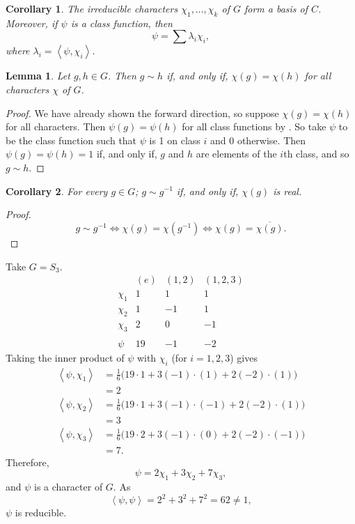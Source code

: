 \documentclass[11pt, notitlepage]{article}
\numberwithin{equation}{section}
\theoremstyle{plain}
\newtheorem{corollary}{Corollary}[theorem]
\newtheorem{lemma}[theorem]{Lemma}
\theoremstyle{definition}
\newenvironment{example}
	{\pushQED{\qed}\renewcommand{\qedsymbol}{$\blacktriangleleft$}\examplex}
	{\popQED\endexamplex}
\newcommand{\inner}[2]{\left\langle #1,#2 \right\rangle}
\begin{document}
\begin{corollary}
The irreducible characters $\chi_1,\dots,\chi_k$ of $G$ form a basis of $C$. Moreover, if $\psi$ is a class function, then
\[
    \psi = \sum \lambda_i \chi_i,
\]
where $\lambda_i = \inner{\psi}{\chi_i}$.
\end{corollary}

\begin{lemma}
Let $g, h \in G$. Then $g \sim h$ if, and only if, $\chi(g) = \chi(h)$ for all characters $\chi$ of $G$.
\end{lemma}

\begin{proof}
We have already shown the forward direction, so suppose $\chi(g) = \chi(h)$ for all characters. Then $\psi(g) = \psi(h)$ for all class functions by . So take $\psi$ to be the class function such that $\psi$ is 1 on class $i$ and 0 otherwise. Then $\psi(g) = \psi(h) = 1$ if, and only if, $g$ and $h$ are elements of the $i$th class, and so $g \sim h$.
\end{proof}

\begin{corollary}
For every $g \in G$; $g \sim g^{-1}$ if, and only if, $\chi(g)$ is real.
\end{corollary}

\begin{proof}
\[
    g \sim g^{-1} \iff \chi(g) = \chi(g^{-1}) \iff \chi(g) = \overline{\chi(g)}.
\]
\end{proof}

\begin{example}
Take $G = S_3$.
\[
    \begin{array}{c|rrr}
               & (e) & (1,2) & (1,2,3) \\\hline
        \chi_1 &  1  &   1   &    1    \\
        \chi_2 &  1  &  -1   &    1    \\
        \chi_3 &  2  &   0   &   -1    \\
               &     &       &         \\
        \psi   &  19 &  -1   &   -2
    \end{array}
\]
Taking the inner product of $\psi$ with $\chi_i$ (for $i=1,2,3$) gives
\begin{align*}
    \inner{\psi}{\chi_1} &= \frac{1}{6}\big(19 \cdot 1 + 3(-1)\cdot (1) + 2(-2) \cdot (1)\big)\\
    &= 2\\
    \inner{\psi}{\chi_2} &= \frac{1}{6}\big(19 \cdot 1 + 3(-1)\cdot (-1) + 2(-2) \cdot (1)\big)\\
    &= 3\\
    \inner{\psi}{\chi_3} &= \frac{1}{6}\big(19 \cdot 2 + 3(-1)\cdot (0) + 2(-2) \cdot (-1)\big)\\
    &= 7.
\end{align*}
Therefore,
\[
    \psi = 2\chi_1 + 3 \chi_2 + 7\chi_3,
\]
and $\psi$ is a character of $G$. As
\[
    \inner{\psi}{\psi} = 2^2 + 3^2 + 7^2 = 62 \neq 1,
\]
$\psi$ is reducible.
\end{example}
\end{document}
